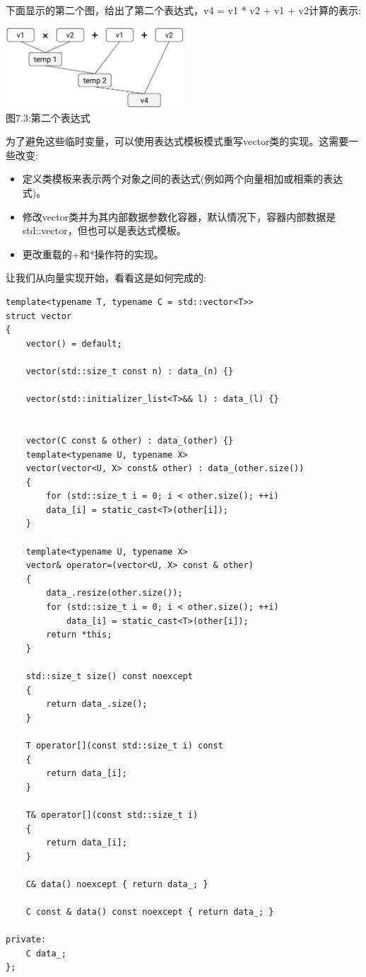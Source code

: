 下面显示的第二个图，给出了第二个表达式，v4 = v1 * v2 + v1 + v2计算的表示:

\begin{center}
\includegraphics[width=0.5\textwidth]{content/3/chapter7/images/3.png}\\
图7.3:第二个表达式
\end{center}

为了避免这些临时变量，可以使用表达式模板模式重写vector类的实现。这需要一些改变:

\begin{itemize}
\item
定义类模板来表示两个对象之间的表达式(例如两个向量相加或相乘的表达式)。

\item
修改vector类并为其内部数据参数化容器，默认情况下，容器内部数据是std::vector，但也可以是表达式模板。

\item
更改重载的+和*操作符的实现。
\end{itemize}

让我们从向量实现开始，看看这是如何完成的:

\begin{lstlisting}[style=styleCXX]
template<typename T, typename C = std::vector<T>>
struct vector
{
	vector() = default;
	
	vector(std::size_t const n) : data_(n) {}
	
	vector(std::initializer_list<T>&& l) : data_(l) {}
	
	
	vector(C const & other) : data_(other) {}
	template<typename U, typename X>
	vector(vector<U, X> const& other) : data_(other.size())
	{
		for (std::size_t i = 0; i < other.size(); ++i)
		data_[i] = static_cast<T>(other[i]);
	}

	template<typename U, typename X>
	vector& operator=(vector<U, X> const & other)
	{
		data_.resize(other.size());
		for (std::size_t i = 0; i < other.size(); ++i)
			data_[i] = static_cast<T>(other[i]);
		return *this;
	}

	std::size_t size() const noexcept
	{
		return data_.size();
	}
	
	T operator[](const std::size_t i) const
	{
		return data_[i];
	}

	T& operator[](const std::size_t i)
	{
		return data_[i];
	}

	C& data() noexcept { return data_; }
	
	C const & data() const noexcept { return data_; }
	
private:
	C data_;
};
\end{lstlisting}


